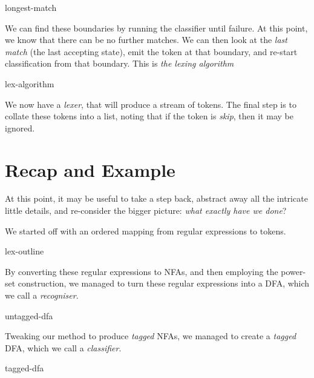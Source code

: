 \begin{center}
\vspace{5mm}
{longest-match}
\end{center}

We can find these boundaries by running the classifier until failure. At this point, we know that there can be no further matches. We can then look at the \emph{last match} (the last accepting state), emit the token at that boundary, and re-start classification from that boundary. This is \emph{the lexing algorithm} 

\begin{center}
    \begin{minipage}{0.5\textwidth}
        {lex-algorithm}
    \end{minipage}
\end{center}

We now have a \emph{lexer}, that will produce a stream of tokens. The final step is to collate these tokens into a list, noting that if the token is \textit{skip}, then it may be ignored. 

\section{Recap and Example}
At this point, it may be useful to take a step back, abstract away all the intricate little details, and re-consider the bigger picture: \textit{what exactly have we done}?

We started off with an ordered mapping from regular expressions to tokens. 

\begin{center}
    {lex-outline}
\end{center}

By converting these regular expressions to NFAs, and then employing the power-set construction, we managed to turn these regular expressions into a DFA, which we call a \emph{recogniser}. 

\begin{center}
{untagged-dfa}
\end{center}

Tweaking our method to produce \emph{tagged} NFAs, we managed to create a \emph{tagged} DFA, which we call a \emph{classifier}.

\begin{center}
{tagged-dfa}
\end{center}

